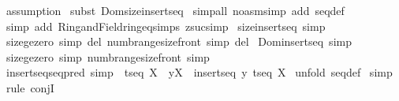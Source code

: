 \begin{isabellebody}
\isamarkupfalse%
\ assumption{\isacharplus}\isanewline
{}\isamarkupfalse%
\ {\isacharparenleft}subst\ Dom{\isacharunderscore}size{\isacharunderscore}insert{\isacharunderscore}seq{\isacharparenright}\isanewline
{}\isamarkupfalse%
\ {\isacharparenleft}simp{\isacharunderscore}all\ {\isacharparenleft}no{\isacharunderscore}asm{\isacharunderscore}simp{\isacharparenright}\ add{\isacharcolon}\ seq{\isacharunderscore}def{\isacharparenright}\isanewline
{}\isamarkupfalse%
\ {\isacharparenleft}simp\ add{\isacharcolon}\ Ring{\isacharunderscore}and{\isacharunderscore}Field{\isachardot}ring{\isacharunderscore}eq{\isacharunderscore}simps\ zsuc{\isacharunderscore}simp{\isacharparenright}\isanewline
{}\isamarkupfalse%
%
\endisatagproof
{\isafoldproof}%
%
\isadelimproof
\isanewline
%
\endisadelimproof
{}\isamarkupfalse%
\ size{\isacharunderscore}insert{\isacharunderscore}seq\ {\isacharbrackleft}simp{\isacharbrackright}\isanewline
\isanewline
{}\isamarkupfalse%
\ size{\isacharunderscore}ge{\isacharunderscore}zero\ {\isacharbrackleft}simp\ del{\isacharbrackright}\ numb{\isacharunderscore}range{\isacharunderscore}size{\isacharunderscore}front\ {\isacharbrackleft}simp\ del{\isacharbrackright}\isanewline
\isanewline
\isanewline
\isanewline
{}\isamarkupfalse%
\ Dom{\isacharunderscore}insertseq\ {\isacharbrackleft}simp{\isacharbrackright}\isanewline
{}\isamarkupfalse%
\ size{\isacharunderscore}ge{\isacharunderscore}zero\ {\isacharbrackleft}simp{\isacharbrackright}\ numb{\isacharunderscore}range{\isacharunderscore}size{\isacharunderscore}front\ {\isacharbrackleft}simp{\isacharbrackright}\isanewline
\isanewline
{}\isamarkupfalse%
\ insertseq{\isacharunderscore}seq{\isacharunderscore}pred\ {\isacharbrackleft}simp{\isacharbrackright}{\isacharcolon}\ \ {\isachardoublequoteopen}{\isacharbrackleft}{\isacharbar}t{\isacharcolon}{\isacharparenleft}seq\ X{\isacharparenright}\ {\isacharsemicolon}\ y{\isacharcolon}X{\isacharbar}{\isacharbrackright}\ {\isacharequal}{\isacharequal}{\isachargreater}\ {\isacharparenleft}insertseq\ y\ t{\isacharparenright}{\isacharcolon}{\isacharparenleft}seq\ X{\isacharparenright}{\isachardoublequoteclose}\isanewline
%
\isadelimproof
%
\endisadelimproof
%
\isatagproof
{}\isamarkupfalse%
\ {\isacharparenleft}unfold\ seq{\isacharunderscore}def{\isacharparenright}\isanewline
{}\isamarkupfalse%
\ simp\isanewline
{}\isamarkupfalse%
\ {\isacharparenleft}rule\ conjI{\isacharparenright}\isanewline

\end{isabellebody}
